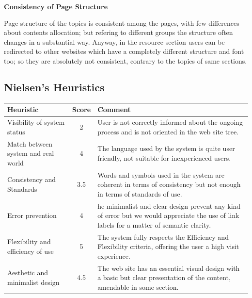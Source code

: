 \medskip
\textbf{Consistency of Page Structure}\par
Page structure of the topics is consistent among the pages, with few differences about contents allocation; but refering to different groups the structure often changes in a substantial way.
Anyway, in the resource section users can be redirected to other websites which have a completely different structure and font too; so they are absolutely not consistent, contrary to the topics of same sections.
\bigskip
\subsection{Nielsen's Heuristics}
\begin{table}[H]
  \begin{center}
    \label{tab:table1}
    \begin{tabular}{||l|c|p{8cm}||} %
      \textbf{Heuristic} & \textbf{Score} & \textbf{Comment}\\
      
      \hline
      Visibility of system status & 2 & User is not correctly informed about the ongoing process and is not oriented in the web site tree.\\
      \hline
      Match between system and real world & 4 & The language used by the system is quite user friendly, not suitable for inexperienced users.\\
      \hline
      Consistency and Standards & 3.5 & Words and symbols used in the system are coherent in terms of consistency but not enough in terms of standards of use.\\
      \hline
      Error prevention & 4 & he minimalist and clear design prevent any kind of error but we would appreciate the use of link labels for a matter of semantic clarity.\\
      \hline
      Flexibility and efficiency of use & 5 & The system fully respects the Efficiency and Flexibility criteria, offering the user a high visit experience.\\
      \hline
      Aesthetic and minimalist design & 4.5 & The web site has an essential visual design with a basic but clear presentation of the content, amendable in some section.\\
    \end{tabular}
  \end{center}
\end{table}


